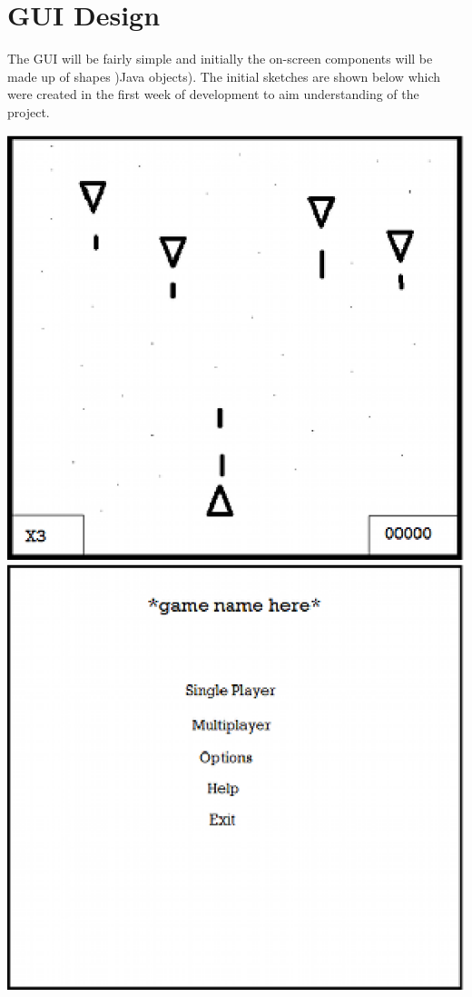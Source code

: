 \section{GUI Design}
\label{sec: gui_design}
The GUI will be fairly simple and initially the on-screen components will be made up of shapes )Java objects). The initial sketches are shown below which were created in the first week of development to aim understanding of the project.\\
\begin{center}
\includegraphics{GUI1.eps}
\includegraphics{GUI2.eps}
\end{center}
